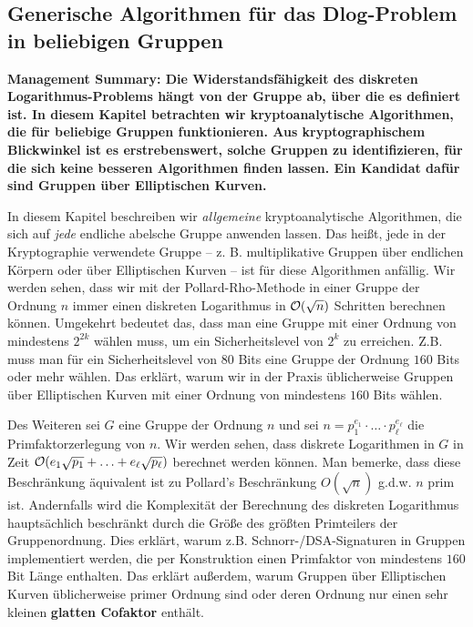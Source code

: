 \begin{refsegment}
\section{Generische Algorithmen für das Dlog-Problem in beliebigen Gruppen}
\label{generic}

\textbf{Management Summary: Die Widerstandsfähigkeit des diskreten Logarithmus-Pro\-b\-lems
hängt von der Gruppe ab, über die es definiert ist. In diesem Kapitel betrachten wir kryptoanalytische Algorithmen, die für beliebige Gruppen funktionieren. Aus kryptographischem Blickwinkel ist es erstrebenswert, solche Gruppen zu identifizieren, für die sich keine besseren Algorithmen finden lassen. Ein Kandidat dafür sind Gruppen über Elliptischen Kurven.\\[0.1cm]}

In diesem Kapitel beschreiben wir {\em allgemeine} kryptoanalytische Algorithmen, die sich auf {\em jede} endliche abelsche Gruppe anwenden lassen. Das heißt, jede in der Kryptographie verwendete Gruppe -- z. B. multiplikative Gruppen über endlichen Körpern oder über Elliptischen Kurven -- ist für diese Algorithmen anfällig. Wir werden sehen, dass wir mit der Pollard-Rho-Methode in einer Gruppe der Ordnung $n$ immer einen diskreten Logarithmus in ${\cal O}(\sqrt n)$ Schritten berechnen können. Umgekehrt bedeutet das, dass man eine Gruppe mit einer Ordnung von mindestens $2^{2k}$ wählen muss, um ein Sicherheitslevel von $2^{k}$ zu erreichen. Z.B. muss man für ein Sicherheitslevel von $80$ Bits eine Gruppe der Ordnung $160$ Bits oder mehr wählen. Das erklärt, warum wir in der Praxis üblicherweise Gruppen über Elliptischen Kurven mit einer Ordnung von mindestens $160$ Bits wählen.

Des Weiteren sei $G$ eine Gruppe der Ordnung $n$ und sei $n=p_1^{e_1} \cdot \ldots \cdot p_{\ell}^{e_{\ell}}$ die Primfaktorzerlegung von $n$. Wir werden sehen, dass diskrete Logarithmen in $G$ in Zeit ${\cal O}(e_1 \sqrt{p_1} + \ldots + e_{\ell}\sqrt{p_{\ell}})$ berechnet werden können. Man bemerke, dass diese Beschränkung äquivalent ist zu Pollard's Beschränkung $O(\sqrt n)$ g.d.w. $n$ prim ist. Andernfalls wird die Komplexität der Berechnung des diskreten Logarithmus hauptsächlich beschränkt durch die Größe des größten Primteilers der Gruppenordnung. Dies erklärt, warum z.B. Schnorr-/DSA-Signaturen in Gruppen implementiert werden, die per Konstruktion einen Primfaktor von mindestens $160$ Bit Länge enthalten. Das erklärt außerdem, warum Gruppen über Elliptischen Kurven üblicherweise primer Ordnung sind oder deren Ordnung nur einen sehr kleinen \textbf{glatten Cofaktor} enthält.



\end{refsegment}
